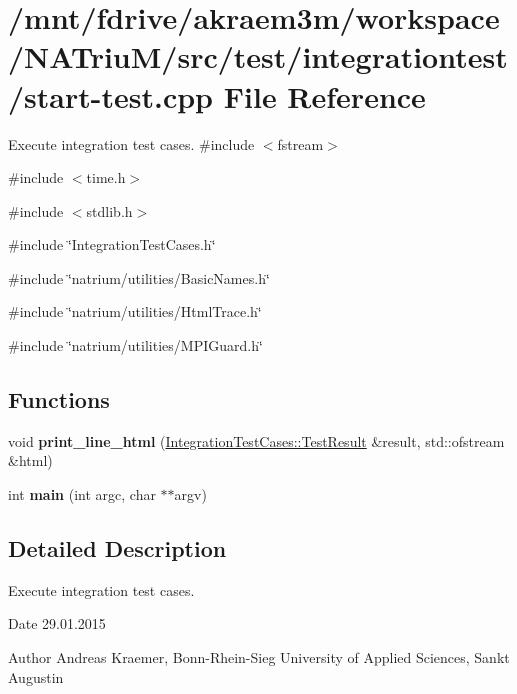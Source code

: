 \hypertarget{start-test_8cpp}{
\section{/mnt/fdrive/akraem3m/workspace/NATriuM/src/test/integrationtest/start-\/test.cpp File Reference}
\label{start-test_8cpp}
}


Execute integration test cases.  
{\ttfamily \#include $<$fstream$>$}\par
{\ttfamily \#include $<$time.h$>$}\par
{\ttfamily \#include $<$stdlib.h$>$}\par
{\ttfamily \#include \char`\"{}IntegrationTestCases.h\char`\"{}}\par
{\ttfamily \#include \char`\"{}natrium/utilities/BasicNames.h\char`\"{}}\par
{\ttfamily \#include \char`\"{}natrium/utilities/HtmlTrace.h\char`\"{}}\par
{\ttfamily \#include \char`\"{}natrium/utilities/MPIGuard.h\char`\"{}}\par
\subsection*{Functions}
\begin{DoxyCompactItemize}
\item 
\hypertarget{start-test_8cpp_a363deb579434784ee372fb2d37def478}{
void {\bfseries print\_\-line\_\-html} (\hyperlink{structnatrium_1_1IntegrationTestCases_1_1TestResult}{IntegrationTestCases::TestResult} \&result, std::ofstream \&html)}
\label{start-test_8cpp_a363deb579434784ee372fb2d37def478}

\item 
\hypertarget{start-test_8cpp_a3c04138a5bfe5d72780bb7e82a18e627}{
int {\bfseries main} (int argc, char $\ast$$\ast$argv)}
\label{start-test_8cpp_a3c04138a5bfe5d72780bb7e82a18e627}

\end{DoxyCompactItemize}


\subsection{Detailed Description}
Execute integration test cases. \begin{DoxyDate}{Date}
29.01.2015 
\end{DoxyDate}
\begin{DoxyAuthor}{Author}
Andreas Kraemer, Bonn-\/Rhein-\/Sieg University of Applied Sciences, Sankt Augustin 
\end{DoxyAuthor}
